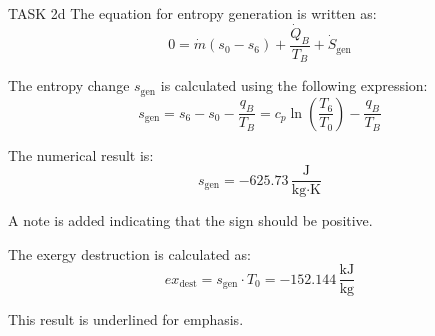 TASK 2d  
The equation for entropy generation is written as:  
\[
0 = \dot{m} \left( s_0 - s_6 \right) + \frac{\dot{Q}_B}{T_B} + \dot{S}_{\text{gen}}
\]  

The entropy change \( s_{\text{gen}} \) is calculated using the following expression:  
\[
s_{\text{gen}} = s_6 - s_0 - \frac{q_B}{T_B} = c_p \ln \left( \frac{T_6}{T_0} \right) - \frac{q_B}{T_B}
\]  

The numerical result is:  
\[
s_{\text{gen}} = -625.73 \, \frac{\text{J}}{\text{kg·K}}
\]  

A note is added indicating that the sign should be positive.  

The exergy destruction is calculated as:  
\[
ex_{\text{dest}} = s_{\text{gen}} \cdot T_0 = -152.144 \, \frac{\text{kJ}}{\text{kg}}
\]  

This result is underlined for emphasis.